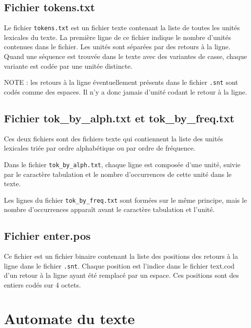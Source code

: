 \subsection{Fichier tokens.txt}
\label{fichier-tokens-txt}
Le fichier \verb+tokens.txt+ est un fichier texte contenant la liste de toutes les unités lexicales
du texte. La première ligne de ce fichier indique le nombre d’unités contenues dans le fichier.
Les unités sont séparées par des retours à la ligne. Quand une séquence est trouvée dans le
texte avec des variantes de casse, chaque variante est codée par une unitée distincte.

\bigskip
\noindent NOTE : les retours à la ligne éventuellement présents dans le fichier \verb+.snt+                                                                              sont codés comme des espaces. Il n’y a donc jamais d’unité codant le retour à la ligne.


\subsection{Fichier tok\_by\_alph.txt et tok\_by\_freq.txt}
Ces deux fichiers sont des fichiers texte qui contiennent la liste des unités lexicales triée
par ordre alphabétique ou par ordre de fréquence.

\bigskip
\noindent Dans le fichier \verb+tok_by_alph.txt+, chaque ligne est composée d’une unité, suivie par
le caractère tabulation et le nombre d’occurrences de cette unité dans le texte.

\bigskip
\noindent Les lignes du fichier \verb+tok_by_freq.txt+ sont formées sur le même principe, mais le
nombre d’occurrences apparaît avant le caractère tabulation et l’unité.


\subsection{Fichier enter.pos}
Ce fichier est un fichier binaire contenant la liste des positions des retours à la ligne dans le
fichier \verb+.snt+. Chaque position est l’indice dans le fichier text.cod d’un retour à la ligne
ayant été remplacé par un espace. Ces positions sont des entiers codés sur 4 octets.





\section{Automate du texte}


